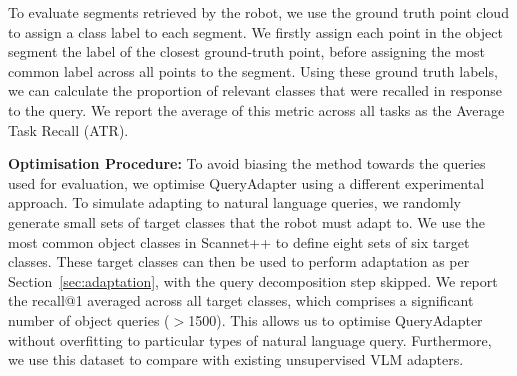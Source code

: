 To evaluate segments retrieved by the robot, we use the ground truth point cloud to assign a class label to each segment. We firstly assign each point in the object segment the label of the closest ground-truth point, before assigning the most common label across all points to the segment. 
Using these ground truth labels, we can calculate the proportion of relevant classes that were recalled in response to the query. We report the average of this metric across all tasks as the Average Task Recall (ATR).

\textbf{Optimisation Procedure:}
To avoid biasing the method towards the queries used for evaluation, we optimise QueryAdapter using a different experimental approach. To simulate adapting to natural language queries, we randomly generate small sets of target classes that the robot must adapt to. We use the most common object classes in Scannet++ to define eight sets of six target classes. These target classes can then be used to perform adaptation as per Section~\ref{sec:adaptation}, with the query decomposition step skipped. 
We report the recall@1 averaged across all target classes, which comprises a significant number of object queries ($>$1500). This allows us to optimise QueryAdapter without overfitting to particular types of natural language query. Furthermore, we use this dataset to compare with existing unsupervised VLM adapters.



